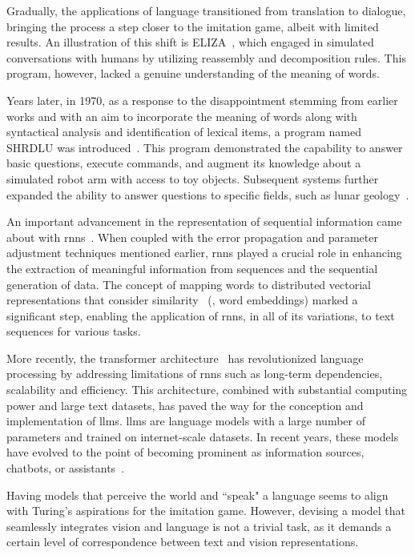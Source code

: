 Gradually, the applications of language transitioned from translation to dialogue, bringing the process a step closer to the imitation game, albeit with limited results. An illustration of this shift is ELIZA~\cite{weizenbaum1966eliza}, which engaged in simulated conversations with humans by utilizing reassembly and decomposition rules. This program, however, lacked a genuine understanding of the meaning of words.

Years later, in 1970, as a response to the disappointment stemming from earlier works and with an aim to incorporate the meaning of words along with syntactical analysis and identification of lexical items, a program named SHRDLU was introduced~\cite{winograd1980does}. This program demonstrated the capability to answer basic questions, execute commands, and augment its knowledge about a simulated robot arm with access to toy objects. Subsequent systems further expanded the ability to answer questions to specific fields, such as lunar geology~\cite{woods1973progress}.

An important advancement in the representation of sequential information came about with \glspl{rnn}~\cite{rumelhart1986learning}. When coupled with the error propagation and parameter adjustment techniques mentioned earlier, \glspl{rnn} played a crucial role in enhancing the extraction of meaningful information from sequences and the sequential generation of data. The concept of mapping words to distributed vectorial representations that consider similarity~\cite{bengio2000neural} (\ie, word embeddings) marked a significant step, enabling the application of \glspl{rnn}, in all of its variations, to text sequences for various tasks.

More recently, the transformer architecture~\cite{vaswani2017attention} has revolutionized language processing by addressing limitations of \glspl{rnn} such as long-term dependencies, scalability and efficiency. This architecture, combined with substantial computing power and large text datasets, has paved the way for the conception and implementation of \glspl{llm}. \glspl{llm} are language models with a large number of parameters and trained on internet-scale datasets. In recent years, these models have evolved to the point of becoming prominent as information sources, chatbots, or assistants~\cite{pal2023chatgpt}. 

Having models that perceive the world and ``speak" a language seems to align with Turing's aspirations for the imitation game. However, devising a model that seamlessly integrates vision and language is not a trivial task, as it demands a certain level of correspondence between text and vision representations.

